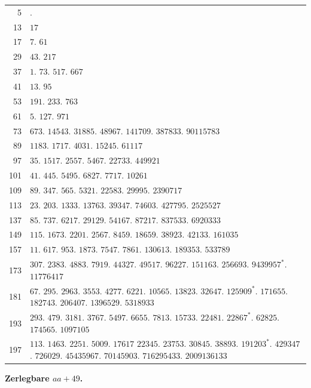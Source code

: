 \begin{longtable}{@{}r|p{\dimexpr\linewidth-38pt\relax}@{}}
5 & .\\
13 & $17$\\
17 & $7$. $61$\\
29 & $43$. $217$\\
37 & $1$. $73$. $517$. $667$\\
41 & $13$. $95$\\
53 & $191$. $233$. $763$\\
61 & $5$. $127$. $971$\\
73 & $673$. $14543$. $31885$. $48967$. $141709$. $387833$. $90115783$\\
89 & $1183$. $1717$. $4031$. $15245$. $61117$\\
97 & $35$. $1517$. $2557$. $5467$. $22733$. $449921$\\
101 & $41$. $445$. $5495$. $6827$. $7717$. $10261$\\
109 & $89$. $347$. $565$. $5321$. $22583$. $29995$. $2390717$\\
113 & $23$. $203$. $1333$. $13763$. $39347$. $74603$. $427795$. $2525527$\\
137 & $85$. $737$. $6217$. $29129$. $54167$. $87217$. $837533$. $6920333$\\
149 & $115$. $1673$. $2201$. $2567$. $8459$. $18659$. $38923$. $42133$. $161035$\\
157 & $11$. $617$. $953$. $1873$. $7547$. $7861$. $130613$. $189353$. $533789$\\
173 & $307$. $2383$. $4883$. $7919$. $44327$. $49517$. $96227$. $151163$. $256693$. $9439957^{*}$. $11776417$\\
181 & $67$. $295$. $2963$. $3553$. $4277$. $6221$. $10565$. $13823$. $32647$. $125909^{*}$. $171655$. $182743$. $206407$. $1396529$. $5318933$\\
193 & $293$. $479$. $3181$. $3767$. $5497$. $6655$. $7813$. $15733$. $22481$. $22867^{*}$. $62825$. $174565$. $1097105$\\
197 & $113$. $1463$. $2251$. $5009$. $17617$ $22345$. $23753$. $30845$. $38893$. $191203^{*}$. $429347$. $726029$. $45435967$. $70145903$. $716295433$. $2009136133$\\
\end{longtable}\endgroup
\par{}
\begin{center}\textbf{Zerlegbare $aa+49$.}\end{center}

